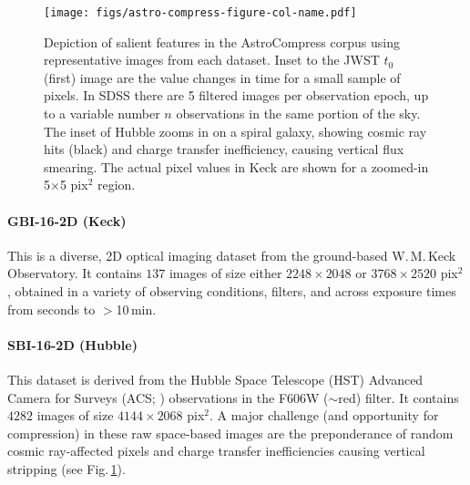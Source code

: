 


\begin{figure}
  \centering
  \texttt{[image: figs/astro-compress-figure-col-name.pdf]}
  \caption{
  Depiction of salient features in the AstroCompress corpus using representative images from each dataset. Inset to the JWST $t_0$ (first) image are the value changes in time for a small sample of pixels. In SDSS there are 5 filtered images per observation epoch, up to a variable number $n$ observations in the same portion of the sky. 
  The inset of Hubble zooms in on a spiral galaxy, showing cosmic ray hits (black) and charge transfer inefficiency, causing vertical flux smearing.
  The actual pixel values in Keck are shown for a zoomed-in 5$\times$5 pix$^2$ region. %
  }
  \label{fig:corpus}
  \vspace{-1em}
\end{figure}



\paragraph{GBI-16-2D (Keck)}
This is a diverse, 2D optical imaging dataset from the ground-based W.\,M.\,Keck Observatory. It contains $137$ images of size either $2248\times2048$ or $3768\times2520$ pix$^{2}$, obtained in a variety of observing conditions, filters, and across exposure times from seconds to $>$10\,min.  

\paragraph{SBI-16-2D (Hubble)}
This dataset is derived from the  Hubble Space Telescope (HST) Advanced Camera for Surveys (ACS; \citealt{2005PASP..117.1049S}) observations in the F606W ($\sim$red) filter. It contains $4282$ images of size $4144\times2068$ pix$^{2}$. A major challenge (and opportunity for compression) in these raw space-based images are the preponderance of random cosmic ray-affected pixels and charge transfer inefficiencies causing vertical stripping (see Fig.\,\ref{fig:corpus}).


